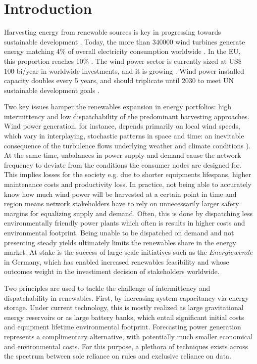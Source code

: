 \chapter{Introduction}
Harvesting energy from renewable sources is key in progressing towards sustainable development \cite{johansson2002energy}.
Today, the more than 340000 wind turbines generate energy matching 4\% of overall electricity consumption worldwide \cite{}.
In the EU, this proportion reaches 10\% \cite{}.
The wind power sector is currently sized at US\$ 100 bi/year in worldwide investments, and it is growing \cite{}.
Wind power installed capacity doubles every 5 years, and should triplicate until 2030 to meet UN sustainable development goals \cite{}.

Two key issues hamper the renewables expansion in energy portfolios: high intermittency and low dispatchability of the predominant harvesting approaches.
Wind power generation, for instance, depends primarily on local wind speeds, which vary in interplaying, stochastic patterns in space and time: an inevitable consequence of the turbulence flows underlying weather and climate conditions \cite{pope2001turbulent}).
At the same time, unbalances in power supply and demand cause the network frequency to deviate from the conditions the consumer nodes are designed for.
This implies losses for the society e.g. due to shorter equipments lifespans, higher maintenance costs and productivity loss.
In practice, not being able to accurately know how much wind power will be harvested at a certain point in time and region means network stakeholders have to rely on unnecessarily larger safety margins for equalizing supply and demand.
Often, this is done by dispatching less environmentally friendly power plants which often is results in higher costs and environmental footprint.
Being unable to be dispatched on demand and not presenting steady yields ultimately limits the renewables share in the energy market.
At stake is the success of large-scale initiatives such as the $\textit{Energiewende}$ in Germany, which has enabled increased renewables feasibility and whose outcomes weight in the investiment decision of stakeholders worldwide.

Two principles are used to tackle the challenge of intermittency and dispatchability in renewables.
First, by increasing system capacitancy via energy storage.
Under current technology, this is mostly realized as large gravitational energy reservoirs or as large battery banks, which entail significant initial costs and equipment lifetime environmental footprint.
Forecasting power generation represents a complimentary alternative, with potentially much smaller economical and environmental costs.
For this purpose, a plethora of techniques exists across the spectrum between sole reliance on rules and exclusive reliance on data.

